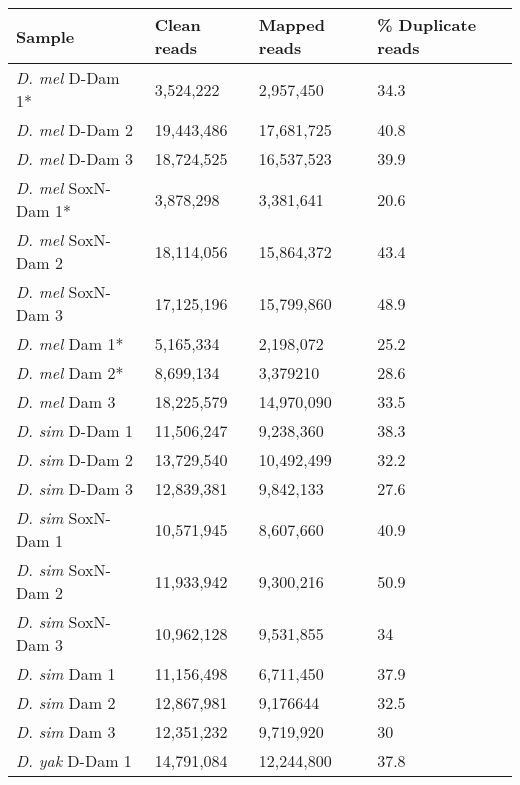 \begin{table}[h]
\centering
\begin{tabular}{|l|l|l|l|}
\hline
\textbf{Sample}             & \textbf{Clean reads} & \textbf{Mapped reads} & \textbf{\% Duplicate reads} \\ \hline
\emph{D. mel} D-Dam 1*    & 3,524,222   & 2,957,450    & 34.3               \\ \hline 
\emph{D. mel} D-Dam 2     & 19,443,486  & 17,681,725   & 40.8               \\ \hline
\emph{D. mel} D-Dam 3     & 18,724,525  & 16,537,523   & 39.9               \\ \hline
\emph{D. mel} SoxN-Dam 1* & 3,878,298   & 3,381,641    & 20.6               \\ \hline
\emph{D. mel} SoxN-Dam 2  & 18,114,056  & 15,864,372   & 43.4               \\ \hline
\emph{D. mel} SoxN-Dam 3  & 17,125,196  & 15,799,860   & 48.9               \\ \hline
\emph{D. mel} Dam 1*      & 5,165,334   & 2,198,072    & 25.2               \\ \hline
\emph{D. mel} Dam 2*      & 8,699,134   & 3,379210     & 28.6               \\ \hline
\emph{D. mel} Dam 3       & 18,225,579  & 14,970,090   & 33.5               \\ \hline
\emph{D. sim} D-Dam 1     & 11,506,247  & 9,238,360    & 38.3               \\ \hline
\emph{D. sim} D-Dam 2     & 13,729,540  & 10,492,499   & 32.2               \\ \hline
\emph{D. sim} D-Dam 3     & 12,839,381  & 9,842,133    & 27.6               \\ \hline
\emph{D. sim} SoxN-Dam 1  & 10,571,945  & 8,607,660    & 40.9               \\ \hline
\emph{D. sim} SoxN-Dam 2  & 11,933,942  & 9,300,216    & 50.9               \\ \hline
\emph{D. sim} SoxN-Dam 3  & 10,962,128  & 9,531,855    & 34                 \\ \hline
\emph{D. sim} Dam 1       & 11,156,498  & 6,711,450    & 37.9               \\ \hline
\emph{D. sim} Dam 2       & 12,867,981  & 9,176644     & 32.5               \\ \hline
\emph{D. sim} Dam 3       & 12,351,232  & 9,719,920    & 30                 \\ \hline
\emph{D. yak} D-Dam 1     & 14,791,084  & 12,244,800   & 37.8               \\ \hline

\end{tabular}
\end{table}
